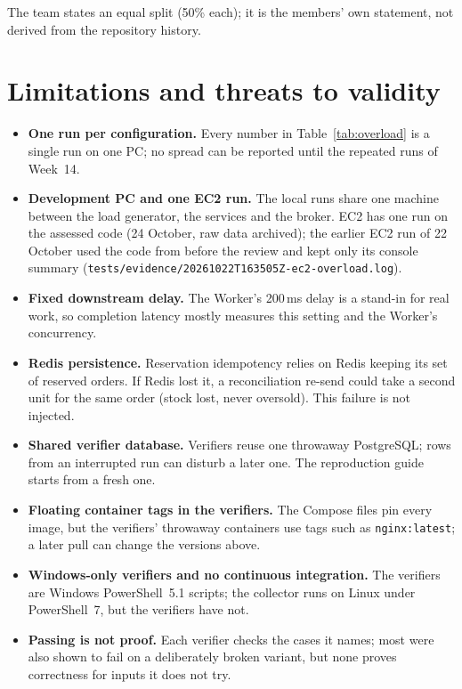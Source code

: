 \documentclass[12pt,a4paper]{article}
\begin{document}
\noindent The team states an equal split (50\% each); it is the members'
own statement, not derived from the repository history.

\section{Limitations and threats to validity}
\label{sec:limits}
\begin{itemize}
  \item \textbf{One run per configuration.} Every number in
    Table~\ref{tab:overload} is a single run on one PC; no spread can be
    reported until the repeated runs of Week~14.
  \item \textbf{Development PC and one EC2 run.} The local runs share one
    machine between the load generator, the services and the broker. EC2 has
    one run on the assessed code (24 October, raw data archived); the earlier
    EC2 run of 22 October used the code from before the review and kept only
    its console summary
    (\nolinkurl{tests/evidence/20261022T163505Z-ec2-overload.log}).
  \item \textbf{Fixed downstream delay.} The Worker's 200\,ms delay is a
    stand-in for real work, so completion latency mostly measures this
    setting and the Worker's concurrency.
  \item \textbf{Redis persistence.} Reservation idempotency relies on Redis
    keeping its set of reserved orders. If Redis lost it, a reconciliation
    re-send could take a second unit for the same order (stock lost, never
    oversold). This failure is not injected.
  \item \textbf{Shared verifier database.} Verifiers reuse one throwaway
    PostgreSQL; rows from an interrupted run can disturb a later one. The
    reproduction guide starts from a fresh one.
  \item \textbf{Floating container tags in the verifiers.} The Compose files
    pin every image, but the verifiers' throwaway containers use tags such as
    \texttt{nginx:latest}; a later pull can change the versions above.
  \item \textbf{Windows-only verifiers and no continuous integration.} The
    verifiers are Windows PowerShell~5.1 scripts; the collector runs on Linux
    under PowerShell~7, but the verifiers have not.
  \item \textbf{Passing is not proof.} Each verifier checks the cases it
    names; most were also shown to fail on a deliberately broken variant, but
    none proves correctness for inputs it does not try.
\end{itemize}
\end{document}
